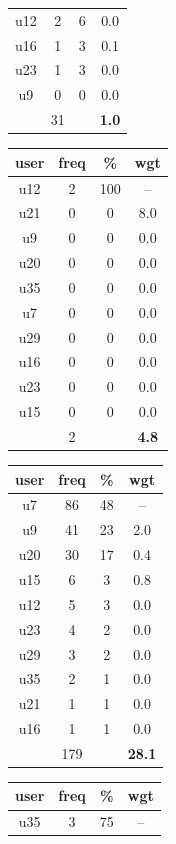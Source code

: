 \begin{table}
\begin{tabular}{ |c|c|c|c| }
	u12 & 2 & 6 & 0.0 \\
	u16 & 1 & 3 & 0.1 \\
	u23 & 1 & 3 & 0.0 \\
	u9 & 0 & 0 & 0.0 \\
	 & 31 & & \textbf{1.0} \\
	\hline
\end{tabular}
\begin{tabular}{ |c|c|c|c| }
	\hline
	\textbf{user} & \textbf{freq} & \textbf{\%} & \textbf{wgt} \\
	\hline
	u12 & 2 & 100 & -- \\
	u21 & 0 & 0 & 8.0 \\
	u9 & 0 & 0 & 0.0 \\
	u20 & 0 & 0 & 0.0 \\
	u35 & 0 & 0 & 0.0 \\
	u7 & 0 & 0 & 0.0 \\
	u29 & 0 & 0 & 0.0 \\
	u16 & 0 & 0 & 0.0 \\
	u23 & 0 & 0 & 0.0 \\
	u15 & 0 & 0 & 0.0 \\
	 & 2 & & \textbf{4.8} \\
	\hline
\end{tabular}
\begin{tabular}{ |c|c|c|c| }
	\hline
	\textbf{user} & \textbf{freq} & \textbf{\%} & \textbf{wgt} \\
	\hline
	u7 & 86 & 48 & -- \\
	u9 & 41 & 23 & 2.0 \\
	u20 & 30 & 17 & 0.4 \\
	u15 & 6 & 3 & 0.8 \\
	u12 & 5 & 3 & 0.0 \\
	u23 & 4 & 2 & 0.0 \\
	u29 & 3 & 2 & 0.0 \\
	u35 & 2 & 1 & 0.0 \\
	u21 & 1 & 1 & 0.0 \\
	u16 & 1 & 1 & 0.0 \\
	 & 179 & & \textbf{28.1} \\
	\hline
\end{tabular}
\begin{tabular}{ |c|c|c|c| }
	\hline
	\textbf{user} & \textbf{freq} & \textbf{\%} & \textbf{wgt} \\
	\hline
	u35 & 3 & 75 & -- \\

\end{tabular}
\end{table}
